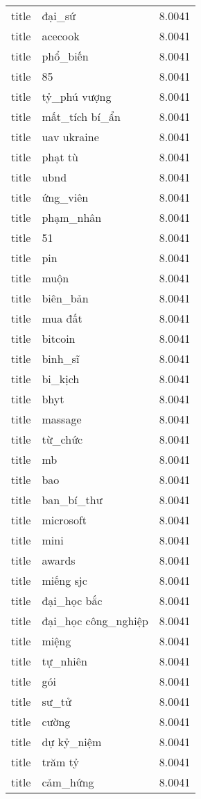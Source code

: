 \documentclass{article}
\begin{document}
\begin{tabular}{lll}
title & đại\_sứ & 8.0041\\
title & acecook & 8.0041\\
title & phổ\_biến & 8.0041\\
title & 85 & 8.0041\\
title & tỷ\_phú vượng & 8.0041\\
title & mất\_tích bí\_ẩn & 8.0041\\
title & uav ukraine & 8.0041\\
title & phạt tù & 8.0041\\
title & ubnd & 8.0041\\
title & ứng\_viên & 8.0041\\
title & phạm\_nhân & 8.0041\\
title & 51 & 8.0041\\
title & pin & 8.0041\\
title & muộn & 8.0041\\
title & biên\_bản & 8.0041\\
title & mua đất & 8.0041\\
title & bitcoin & 8.0041\\
title & binh\_sĩ & 8.0041\\
title & bi\_kịch & 8.0041\\
title & bhyt & 8.0041\\
title & massage & 8.0041\\
title & từ\_chức & 8.0041\\
title & mb & 8.0041\\
title & bao & 8.0041\\
title & ban\_bí\_thư & 8.0041\\
title & microsoft & 8.0041\\
title & mini & 8.0041\\
title & awards & 8.0041\\
title & miếng sjc & 8.0041\\
title & đại\_học bắc & 8.0041\\
title & đại\_học công\_nghiệp & 8.0041\\
title & miệng & 8.0041\\
title & tự\_nhiên & 8.0041\\
title & gói & 8.0041\\
title & sư\_tử & 8.0041\\
title & cường & 8.0041\\
title & dự kỷ\_niệm & 8.0041\\
title & trăm tỷ & 8.0041\\
title & cảm\_hứng & 8.0041\\

\end{tabular}
\end{document}

